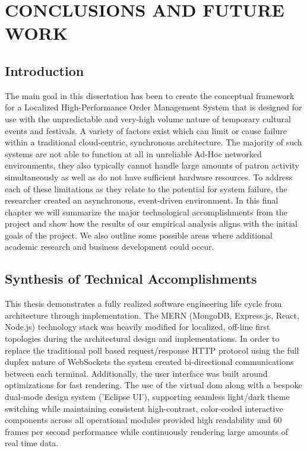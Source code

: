 \chapter{CONCLUSIONS AND FUTURE WORK}
\label{ch:conclusions}

\section{Introduction}
The main goal in this dissertation has been to create the conceptual framework for a Localized High-Performance Order Management System that is designed for use with the unpredictable and very-high volume nature of temporary cultural events and festivals. A variety of factors exist which can limit or cause failure within a traditional cloud-centric, synchronous architecture. The majority of such systems are not able to function at all in unreliable Ad-Hoc networked environments, they also typically cannot handle large amounts of patron activity simultaneously as well as do not have sufficient hardware resources. To address each of these limitations as they relate to the potential for system failure, the researcher created an asynchronous, event-driven environment. In this final chapter we will summarize the major technological accomplishments from the project and show how the results of our empirical analysis aligns with the initial goals of the project. We also outline some possible areas where additional academic research and business development could occur.

\section{Synthesis of Technical Accomplishments}
This thesis demonstrates a fully realized software engineering life cycle from architecture through implementation. The MERN (MongoDB, Express.js, React, Node.js) technology stack \cite{banker2011mongodb, express, freeman2019pro, tilkov2010node} was heavily modified for localized, off-line first topologies during the architectural design and implementations. In order to replace the traditional poll based request/response HTTP protocol using the full duplex nature of WebSockets \cite{fette2011websocket, pimentel2012communicating} the system created bi-directional communications between each terminal. Additionally, the user interface was built around optimizations for fast rendering. The use of the virtual dom along with a bespoke dual-mode design system ('Eclipse UI'), supporting seamless light/dark theme switching while maintaining consistent high-contrast, color-coded interactive components across all operational modules \cite{freeman2019pro} provided high readability and 60 frames per second performance while continuously rendering large amounts of real time data.

